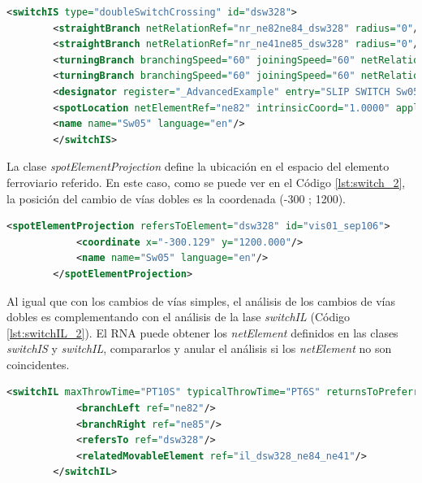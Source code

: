      \begin{lstlisting}[language = XML, caption = Clase \textit{switchIS} (doubleSwitchCrossing) , label = {lst:switchIS_2}]
    	<switchIS type="doubleSwitchCrossing" id="dsw328">
    	<straightBranch netRelationRef="nr_ne82ne84_dsw328" radius="0"/>
    	<straightBranch netRelationRef="nr_ne41ne85_dsw328" radius="0"/>
    	<turningBranch branchingSpeed="60" joiningSpeed="60" netRelationRef="nr_ne41ne82_dsw328" radius="-500"/>
    	<turningBranch branchingSpeed="60" joiningSpeed="60" netRelationRef="nr_ne84ne85_dsw328" radius="-500"/>
    	<designator register="_AdvancedExample" entry="SLIP SWITCH Sw05"/>
    	<spotLocation netElementRef="ne82" intrinsicCoord="1.0000" applicationDirection="normal" id="dsw328_sloc01"/>
    	<name name="Sw05" language="en"/>
    	</switchIS>
    \end{lstlisting}

    La clase \textit{spotElementProjection} define la ubicación en el espacio del elemento ferroviario referido. En este caso, como se puede ver en el Código \ref{lst:switch_2}, la posición del cambio de vías dobles es la coordenada (-300 ; 1200).
    
    \begin{lstlisting}[language = XML, caption = Clase \textit{spotElementProjection} (doubleSwitchCrossing) , label = {lst:switch_2}]
    	<spotElementProjection refersToElement="dsw328" id="vis01_sep106">
	    	<coordinate x="-300.129" y="1200.000"/>
	    	<name name="Sw05" language="en"/>
    	</spotElementProjection>
    \end{lstlisting}

    Al igual que con los cambios de vías simples, el análisis de los cambios de vías dobles es complementando con el análisis de la lase \textit{switchIL} (Código \ref{lst:switchIL_2}). El RNA puede obtener los \textit{netElement} definidos en las clases \textit{switchIS} y \textit{switchIL}, compararlos y anular el análisis si los \textit{netElement} no son coincidentes.
    
    \begin{lstlisting}[language = XML, caption = Clase \textit{SwitchIL} (doubleSwitchCrossing) , label = {lst:switchIL_2}]
    	<switchIL maxThrowTime="PT10S" typicalThrowTime="PT6S" returnsToPreferredPosition="false" isKeyLocked="false" id="il_dsw328_ne82_ne85">
	    	<branchLeft ref="ne82"/>
	    	<branchRight ref="ne85"/>
	    	<refersTo ref="dsw328"/>
	    	<relatedMovableElement ref="il_dsw328_ne84_ne41"/>
    	</switchIL>
    \end{lstlisting}
    
